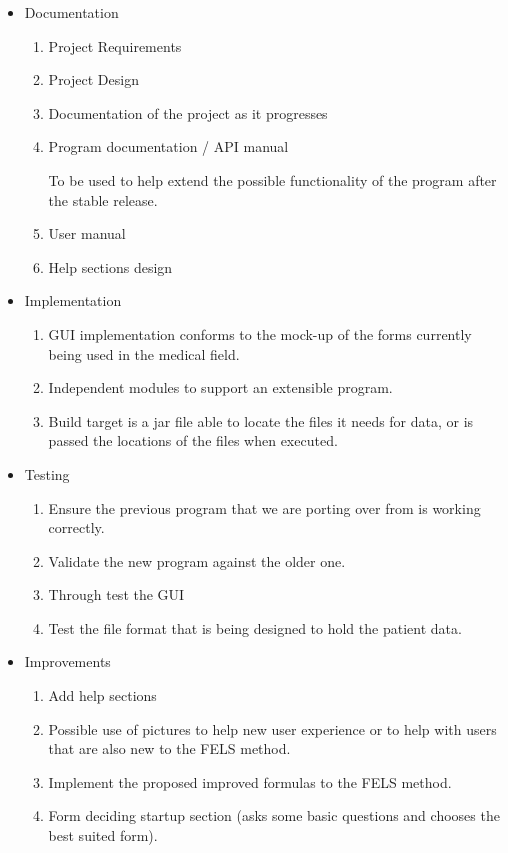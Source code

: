 \documentclass[12pt,letterpaper]{article}
\begin{document}
\begin{itemize}

\item Documentation
	\begin{enumerate}

	\item Project Requirements
	\item Project Design
	\item Documentation of the project as it progresses
	\item Program documentation / API manual

To be used to help extend the possible functionality of the program after the stable release.
	\item User manual
	\item Help sections design

	\end{enumerate}

\item Implementation
	\begin{enumerate}

	\item GUI implementation conforms to the mock-up of the forms currently being used in the medical field.
	\item Independent modules to support an extensible program.
	\item Build target is a jar file able to locate the files it needs for data, or is passed the locations of the files when executed.

	\end{enumerate}
\item Testing
	\begin{enumerate}
	
	\item Ensure the previous program that we are porting over from is working correctly.
	\item Validate the new program against the older one.
	\item Through test the GUI
	\item Test the file format that is being designed to hold the patient data.

	\end{enumerate}
\item Improvements
	\begin{enumerate}
	
	\item Add help sections
	\item Possible use of pictures to help new user experience or to help with users that are also new to the FELS method.
	\item Implement the proposed improved formulas to the FELS method.
	\item Form deciding startup section (asks some basic questions and chooses the best suited form).

	\end{enumerate}

\end{itemize}
\end{document}
